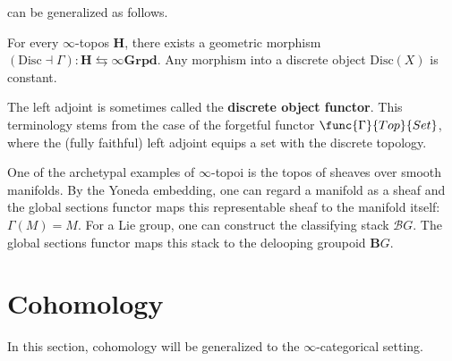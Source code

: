          can be generalized as follows.
        \begin{property}
            For every $\infty$-topos $\mathbf{H}$, there exists a geometric morphism $(\mathrm{Disc}\dashv\Gamma):\mathbf{H}\leftrightarrows\infty\mathbf{Grpd}$. Any morphism into a discrete object $\mathrm{Disc}(X)$ is constant.
    
            The left adjoint is sometimes called the \textbf{discrete object functor}. This terminology stems from the case of the forgetful functor $\func{\Gamma}{Top}{Set}$, where the (fully faithful) left adjoint equips a set with the discrete topology.
        \end{property}
        \begin{example}
            One of the archetypal examples of $\infty$-topoi is the topos of sheaves over smooth manifolds. By the Yoneda embedding, one can regard a manifold as a sheaf and the global sections functor maps this representable sheaf to the manifold itself: $\Gamma(M)=M$. For a Lie group, one can construct the classifying stack $\mathcal{B}G$. The global sections functor maps this stack to the delooping groupoid $\mathbf{B}G$.
        \end{example}
    
    
    
    \section{Cohomology}
    
        In this section, cohomology will be generalized to the $\infty$-categorical setting.
    
